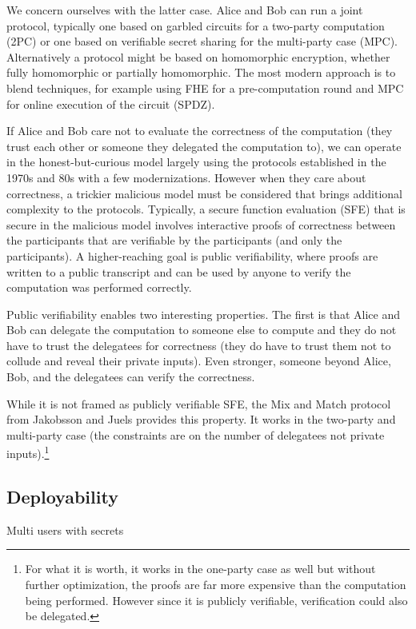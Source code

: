We concern ourselves with the latter case. Alice and Bob can run a joint protocol, typically one based on garbled circuits for a two-party computation (2PC) or one based on verifiable secret sharing for the multi-party case (MPC). Alternatively a protocol might be based on homomorphic encryption, whether fully homomorphic or partially homomorphic. The most modern approach is to blend techniques, for example using FHE for a pre-computation round and MPC for online execution of the circuit (SPDZ).

If Alice and Bob care not to evaluate the correctness of the computation (they trust each other or someone they delegated the computation to), we can operate in the honest-but-curious model largely using the protocols established in the 1970s and 80s with a few modernizations. However when they care about correctness, a trickier malicious model must be considered that brings additional complexity to the protocols. Typically, a secure function evaluation (SFE) that is secure in the malicious model involves interactive proofs of correctness between the participants that are verifiable by the participants (and only the participants). A higher-reaching goal is public verifiability, where proofs are written to a public transcript and can be used by anyone to verify the computation was performed correctly.

Public verifiability enables two interesting properties. The first is that Alice and Bob can delegate the computation to someone else to compute and they do not have to trust the delegatees for correctness (they do have to trust them not to collude and reveal their private inputs). Even stronger, someone beyond Alice, Bob, and the delegatees can verify the correctness.

While it is not framed as publicly verifiable SFE, the Mix and Match protocol from Jakobsson and Juels provides this property. It works in the two-party and multi-party case (the constraints are on the number of delegatees not private inputs).\footnote{For what it is worth, it works in the one-party case as well but without further optimization, the proofs are far more expensive than the computation being performed. However since it is publicly verifiable, verification could also be delegated.}

\subsection{Deployability}

Multi users with secrets

